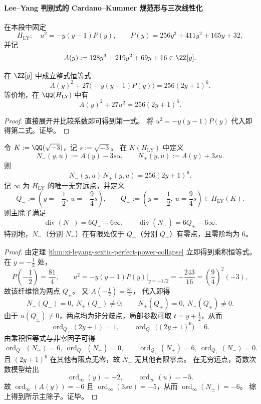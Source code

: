 \paragraph{Lee--Yang 判别式的 Cardano--Kummer 规范形与三次线性化}
在本段中固定
\[
H_{\mathrm{LY}}:\quad u^2=-y(y-1)P(y),\qquad P(y)=256y^3+411y^2+165y+32,
\]
并记
\[
A(y):=128y^3+219y^2+69y+16\in\ZZ[y].
\]

\begin{theorem}\label{thm:xi-leyang-sextic-perfect-power-collapse}
在 \(\ZZ[y]\) 中成立整式恒等式
\[
A(y)^2+27\bigl(-y(y-1)P(y)\bigr)=256(2y+1)^6.
\]
等价地，在 \(\QQ(H_{\mathrm{LY}})\) 中有
\[
A(y)^2+27u^2=256(2y+1)^6.
\]
\end{theorem}
\begin{proof}
直接展开并比较系数即可得到第一式。
将 \(u^2=-y(y-1)P(y)\) 代入即得第二式。证毕。
\end{proof}

\begin{proposition}\label{prop:xi-leyang-cardano-numerator-divisor-visibility}
令 \(K:=\QQ(\sqrt{-3})\)，记 \(s:=\sqrt{-3}\)。
在 \(K(H_{\mathrm{LY}})\) 中定义
\[
N_-(y,u):=A(y)-3su,\qquad N_+(y,u):=A(y)+3su.
\]
则
\[
N_-(y,u)\,N_+(y,u)=256(2y+1)^6.
\]
记 \(\infty\) 为 \(H_{\mathrm{LY}}\) 的唯一无穷远点，并定义
\[
Q_-:=\left(y=-\frac12,\ u=-\frac94 s\right),\qquad
Q_+:=\left(y=-\frac12,\ u=\frac94 s\right)\in H_{\mathrm{LY}}(K).
\]
则主除子满足
\[
\operatorname{div}(N_-)=6Q_--6\infty,\qquad
\operatorname{div}(N_+)=6Q_+-6\infty.
\]
特别地，\(N_-\)（分别 \(N_+\)）在有限处仅于 \(Q_-\)（分别 \(Q_+\)）有零点，且零阶均为 \(6\)。
\end{proposition}
\begin{proof}
由定理 \ref{thm:xi-leyang-sextic-perfect-power-collapse} 立即得到乘积恒等式。
在 \(y=-\frac12\) 处，
\[
P\!\left(-\frac12\right)=\frac{81}{4},\qquad
u^2=-y(y-1)P(y)\big|_{y=-1/2}=-\frac{243}{16}=\left(\frac94\right)^2(-3),
\]
故该纤维恰为两点 \(Q_\pm\)。
又
\(
A\!\left(-\frac12\right)=\frac{81}{4}
\)，
代入即得
\[
N_-(Q_-)=0,\ N_+(Q_-)\neq 0;\qquad
N_+(Q_+)=0,\ N_-(Q_+)\neq 0.
\]
由于 \(u(Q_\pm)\neq 0\)，两点均为非分歧点，局部参数可取 \(t=y+\frac12\)，从而
\[
\operatorname{ord}_{Q_\pm}(2y+1)=1,\qquad
\operatorname{ord}_{Q_\pm}\bigl((2y+1)^6\bigr)=6.
\]
由乘积恒等式与非零因子可得
\[
\operatorname{ord}_{Q_-}(N_-)=6,\ \operatorname{ord}_{Q_-}(N_+)=0,\qquad
\operatorname{ord}_{Q_+}(N_+)=6,\ \operatorname{ord}_{Q_+}(N_-)=0.
\]
且 \((2y+1)^6\) 在其他有限点无零，故 \(N_\pm\) 无其他有限零点。
在无穷远点，奇数次数模型给出
\[
\operatorname{ord}_\infty(y)=-2,\qquad \operatorname{ord}_\infty(u)=-5.
\]
故
\(
\operatorname{ord}_\infty(A(y))=-6
\) 且
\(
\operatorname{ord}_\infty(3su)=-5
\)，从而
\(
\operatorname{ord}_\infty(N_\pm)=-6
\)。
综上得到所示主除子。证毕。
\end{proof}

